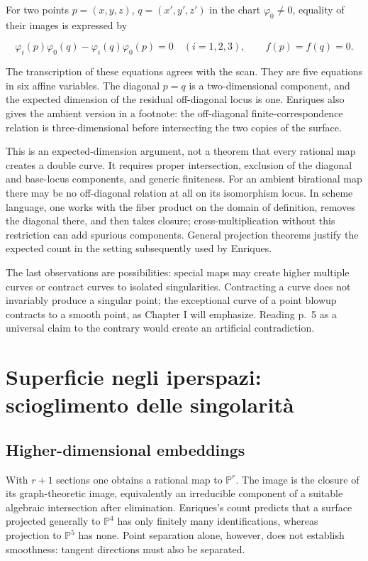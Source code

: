 For two points \(p=(x,y,z)\), \(q=(x',y',z')\) in the chart \(\varphi_0\ne0\), equality of their images is expressed by

\[
\varphi_i(p)\varphi_0(q)-\varphi_i(q)\varphi_0(p)=0
\quad(i=1,2,3),\qquad f(p)=f(q)=0.
\]

The transcription of these equations agrees with the scan. They are five equations in six affine variables. The diagonal \(p=q\) is a two-dimensional component, and the expected dimension of the residual off-diagonal locus is one. Enriques also gives the ambient version in a footnote: the off-diagonal finite-correspondence relation is three-dimensional before intersecting the two copies of the surface.

This is an expected-dimension argument, not a theorem that every rational map creates a double curve. It requires proper intersection, exclusion of the diagonal and base-locus components, and generic finiteness. For an ambient birational map there may be no off-diagonal relation at all on its isomorphism locus. In scheme language, one works with the fiber product on the domain of definition, removes the diagonal there, and then takes closure; cross-multiplication without this restriction can add spurious components. General projection theorems justify the expected count in the setting subsequently used by Enriques.

The last observations are possibilities: special maps may create higher multiple curves or contract curves to isolated singularities. Contracting a curve does not invariably produce a singular point; the exceptional curve of a point blowup contracts to a smooth point, as Chapter I will emphasize. Reading p.~5 as a universal claim to the contrary would create an artificial contradiction.

\section[Superficie negli iperspazi]{Superficie negli iperspazi: scioglimento delle singolarità}
\label{enriques-intro-3}

\subsection{Higher-dimensional embeddings}

With \(r+1\) sections one obtains a rational map to \(\mathbb P^r\). The image is the closure of its graph-theoretic image, equivalently an irreducible component of a suitable algebraic intersection after elimination. Enriques's count predicts that a surface projected generally to \(\mathbb P^4\) has only finitely many identifications, whereas projection to \(\mathbb P^5\) has none. Point separation alone, however, does not establish smoothness: tangent directions must also be separated.

